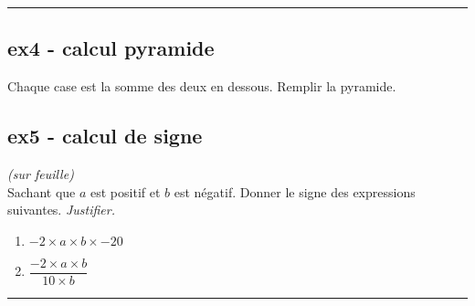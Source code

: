 \documentclass[11pt]{article}
\newcommand{\horrule}[1]{\rule{\linewidth}{#1}} %
\begin{document}
\vspace{-0.4cm}
\horrule{1px}
\vspace{-0.8cm}

\begin{multicols}{2}

  \subsection*{ex4 - calcul pyramide}

  Chaque case est la somme des deux en dessous. Remplir la pyramide.


  \subsection*{ex5 - calcul de signe}
  \textit{(sur feuille)}\\
  Sachant que $a$ est positif et $b$ est négatif. Donner le signe des expressions suivantes. \textit{Justifier.}

  \begin{enumerate}
  \item  $-2 \times a \times b \times -20$
  \item $\dfrac{-2 \times a \times b}{10 \times b}$
  \end{enumerate}

\end{multicols}

\vspace{-0.4cm}
\horrule{1px}
\vspace{-0.8cm}
\end{document}

